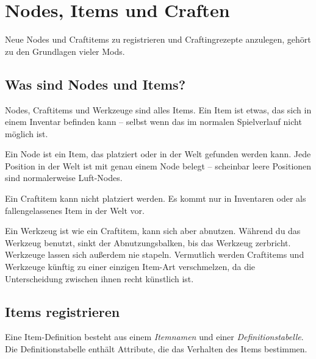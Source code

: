\chapter{Nodes, Items und Craften}
\label{ch:items/nodes-items-crafting}

Neue Nodes und Craftitems zu registrieren und
Craftingrezepte anzulegen, gehört
zu den Grundlagen vieler Mods.

\section{Was sind Nodes und Items?}\label{was-sind-nodes-und-items}

Nodes, Craftitems und Werkzeuge sind alles Items. Ein Item ist etwas,
das sich in einem Inventar befinden kann --
selbst wenn das im normalen Spielverlauf nicht möglich ist.

Ein Node ist ein Item, das platziert oder in der Welt gefunden werden
kann. Jede Position in der Welt ist mit genau einem Node belegt --
scheinbar leere Positionen sind normalerweise Luft-Nodes.

Ein Craftitem kann nicht platziert werden. Es kommt nur in Inventaren
oder als fallengelassenes Item in der Welt vor.

Ein Werkzeug ist wie ein Craftitem, kann sich aber abnutzen. Während du
das Werkzeug benutzt, sinkt der Abnutzungsbalken, bis das Werkzeug
zerbricht. Werkzeuge lassen sich außerdem nie stapeln. Vermutlich werden
Craftitems und Werkzeuge künftig zu einer einzigen Item-Art
verschmelzen, da die Unterscheidung zwischen ihnen recht künstlich ist.

\section{Items registrieren}\label{items-registrieren}

Eine Item-Definition besteht aus einem \emph{Itemnamen} und einer
\emph{Definitionstabelle}. Die Definitionstabelle enthält Attribute, die
das Verhalten des Items bestimmen.

\begin{Shaded}
\begin{Highlighting}[]
\OperatorTok{(}\OperatorTok{,} \OperatorTok{\{}
     \OperatorTok{=} \OperatorTok{,}
     \OperatorTok{=} \OperatorTok{,}
\OperatorTok{\})}
\end{Highlighting}
\end{Shaded}

